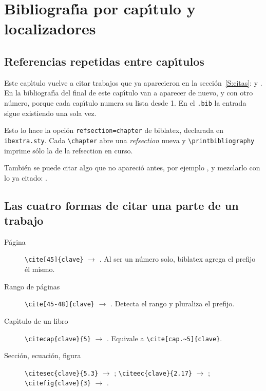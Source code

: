 \chapter{Bibliograf\'{\i}a por cap\'{\i}tulo y localizadores}
\label{C:cap2}

\graphicspath{{figs/cap2/}{figs/comunes/}}

\section{Referencias repetidas entre cap\'{\i}tulos}
\label{S:repetidas}

Este cap\'{\i}tulo vuelve a citar trabajos que ya aparecieron en la
secci\'{o}n~\ref{S:citas}: \cite{Bohm1952PRp166} y \cite{Bohm1952PRp180}. En la
bibliograf\'{\i}a del final de este cap\'{\i}tulo van a aparecer de nuevo, y con otro
n\'{u}mero, porque cada cap\'{\i}tulo numera su lista desde 1. En el \texttt{.bib} la
entrada sigue existiendo una sola vez.

Esto lo hace la opci\'{o}n \verb|refsection=chapter| de biblatex, declarada en
\texttt{ibextra.sty}. Cada \verb|\chapter| abre una \emph{refsection} nueva y
\verb|\printbibliography| imprime s\'{o}lo la de la refsection en curso.

Tambi\'{e}n se puede citar algo que no apareci\'{o} antes, por ejemplo
\cite{Laricch2009AAMOP_ICBp3}, y mezclarlo con lo ya citado:
\cite{Bohm1952PRp166,Laricch2009AAMOP_ICBp3}.

\section{Las cuatro formas de citar una parte de un trabajo}
\label{S:localizadores}

\begin{description}
\item[P\'{a}gina] \verb|\cite[45]{clave}| $\rightarrow$ \cite[45]{Sakurai2011}.
  Al ser un n\'{u}mero solo, biblatex agrega el prefijo \'{e}l mismo.
\item[Rango de p\'{a}ginas] \verb|\cite[45-48]{clave}| $\rightarrow$
  \cite[45-48]{Sakurai2011}. Detecta el rango y pluraliza el prefijo.
\item[Cap\'{\i}tulo de un libro] \verb|\citecap{clave}{5}| $\rightarrow$
  . Equivale a \verb|\cite[cap.~5]{clave}|.
\item[Secci\'{o}n, ecuaci\'{o}n, figura] \verb|\citesec{clave}{5.3}| $\rightarrow$
  ; \verb|\citeec{clave}{2.17}| $\rightarrow$
  ; \verb|\citefig{clave}{3}| $\rightarrow$
  .
\end{description}

